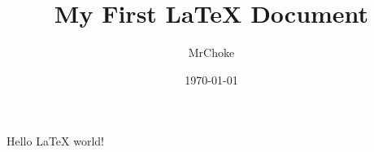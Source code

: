 \documentclass{article}
\title{My First \LaTeX{} Document}
\author{MrChoke}
\date{\today}
\begin{document}
\maketitle
Hello \LaTeX{}  world!
\end{document}
